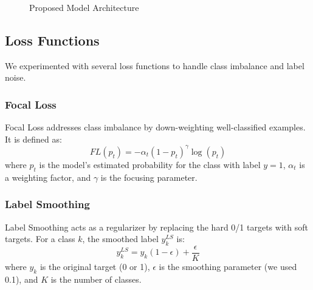 \documentclass[conference]{IEEEtran}
\begin{document}
\begin{figure}[htbp]
\begin{center}
\end{center}
\caption{Proposed Model Architecture}
\label{fig:architecture}
\end{figure}

\subsection{Loss Functions}
We experimented with several loss functions to handle class imbalance and label noise.

\subsubsection{Focal Loss}
Focal Loss \cite{lin2017focal} addresses class imbalance by down-weighting well-classified examples. It is defined as:
\begin{equation}
FL(p_t) = -\alpha_t (1-p_t)^\gamma \log(p_t)
\end{equation}
where $p_t$ is the model's estimated probability for the class with label $y=1$, $\alpha_t$ is a weighting factor, and $\gamma$ is the focusing parameter.

\subsubsection{Label Smoothing}
Label Smoothing \cite{muller2019label} acts as a regularizer by replacing the hard 0/1 targets with soft targets. For a class $k$, the smoothed label $y^{LS}_k$ is:
\begin{equation}
y^{LS}_k = y_k(1-\epsilon) + \frac{\epsilon}{K}
\end{equation}
where $y_k$ is the original target (0 or 1), $\epsilon$ is the smoothing parameter (we used 0.1), and $K$ is the number of classes.
\end{document}
